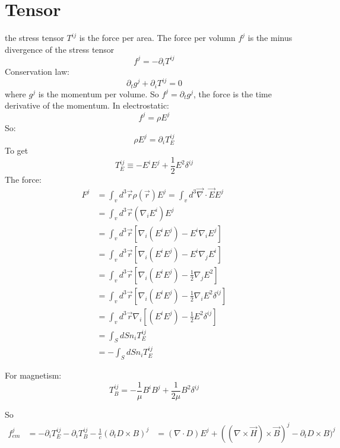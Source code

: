 \section{Tensor}
the stress tensor $T^{ij}$ is the force per area. The force per volumn $f^j$
is the minus divergence of the stress tensor
\[ f^j = -\partial_iT^{ij} \]
Conservation law:
\[  \partial_tg^j+\partial_iT^{ij} = 0 \]
where $g^j$ is the momentum per volume. So $f^j=\partial_tg^j$, the force is
the time derivative of the momentum.
In electrostatic:
\[  f^j = \rho E^j \]
So:
\[  \rho E^j = \partial_iT_E^{ij} \]
To get 
\[  T_E^{ij} \equiv -E^iE^j + \frac{1}{2}E^2\delta^{ij} \]
The force:
\begin{equation*}
\begin{aligned}  
    F^j &= \int_v d^3\vec{r}\rho(\vec{r})E^j = \int_v d^3\vec{\nabla}\cdot\vec{E}E^j	\\
	&= \int_v d^3\vec{r}(\nabla_iE^i)E^j \\
	&= \int_v d^3\vec{r} [\nabla_i(E^iE^j) - E^i\nabla_iE^j ] \\
	&= \int_v d^3\vec{r} [\nabla_i(E^iE^j) - E^i\nabla_jE^i ] \\
	&= \int_v d^3\vec{r} [\nabla_i(E^iE^j) - \frac{1}{2}\nabla_jE^2 ] \\
	&= \int_v d^3\vec{r} [\nabla_i(E^iE^j) - \frac{1}{2}\nabla_iE^2\delta^{ij} ] \\
	&= \int_v d^3\vec{r} \nabla_i [(E^iE^j) - \frac{1}{2}E^2\delta^{ij} ] \\
	&= \int_S dS n_i T_E^{ij} \\
	&= -\int_S dS n_i T_E^{ij} 
\end{aligned}  
\end{equation*}

For magnetism:
\[  T_B^{ij} = -\frac{1}{\mu}B^iB^j + \frac{1}{2\mu}B^2\delta^{ij} \]

So
\[
    \begin{aligned}
	f^j_{em} &= -\partial_iT_E^{ij} - \partial_iT_B^{ij} - \frac{1}{c}(\partial_tD\times B)^j
    &= (\nabla\cdot D)E^j + ((\nabla\times\vec{H})\times\vec{B})^j - \partial_tD\times B)^j 
    \end{aligned}
\]
